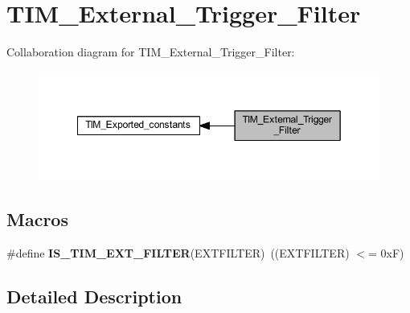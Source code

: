 \hypertarget{group___t_i_m___external___trigger___filter}{}\section{T\+I\+M\+\_\+\+External\+\_\+\+Trigger\+\_\+\+Filter}
\label{group___t_i_m___external___trigger___filter}
Collaboration diagram for T\+I\+M\+\_\+\+External\+\_\+\+Trigger\+\_\+\+Filter\+:\nopagebreak
\begin{figure}[H]
\begin{center}
\leavevmode
\includegraphics[width=349pt]{group___t_i_m___external___trigger___filter}
\end{center}
\end{figure}
\subsection*{Macros}
\begin{DoxyCompactItemize}
\item 
\mbox{\label{group___t_i_m___external___trigger___filter_ga500df0646edcf07316a55a652502ca87}} 
\#define {\bfseries I\+S\+\_\+\+T\+I\+M\+\_\+\+E\+X\+T\+\_\+\+F\+I\+L\+T\+ER}(E\+X\+T\+F\+I\+L\+T\+ER)~((E\+X\+T\+F\+I\+L\+T\+ER) $<$= 0x\+F)
\end{DoxyCompactItemize}


\subsection{Detailed Description}

